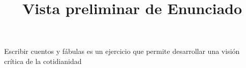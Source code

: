 \documentclass[a4paper,12pt]{article}\usepackage[utf8]{inputenc}\usepackage[spanish]{babel}\usepackage{times}
\title{Vista preliminar de Enunciado}
\begin{document}
\twocolumn 

\maketitle

Escribir cuentos y fábulas es un ejercicio que permite desarrollar una visión crítica de la cotidianidad
\end{document}
